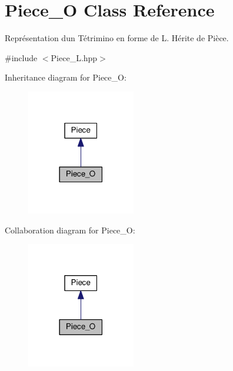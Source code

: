 \hypertarget{classPiece__O}{}\section{Piece\+\_\+O Class Reference}
\label{classPiece__O}


Représentation d\textquotesingle{}un Tétrimino en forme de L. Hérite de Pièce.  




{\ttfamily \#include $<$Piece\+\_\+\+L.\+hpp$>$}



Inheritance diagram for Piece\+\_\+O\+:
\nopagebreak
\begin{figure}[H]
\begin{center}
\leavevmode
\includegraphics[width=134pt]{classPiece__O__inherit__graph}
\end{center}
\end{figure}


Collaboration diagram for Piece\+\_\+O\+:
\nopagebreak
\begin{figure}[H]
\begin{center}
\leavevmode
\includegraphics[width=134pt]{classPiece__O__coll__graph}
\end{center}
\end{figure}
